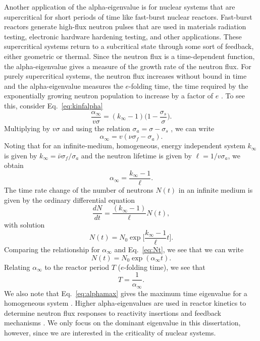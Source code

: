
Another application of the alpha-eigenvalue is for nuclear systems that are supercritical for short periods of time like fast-burst nuclear reactors. Fast-burst reactors generate high-flux neutron pulses that are used in materials radiation testing, electronic hardware hardening testing, and other applications. These supercritical systems return to a subcritical state through some sort of feedback, either geometric or thermal. Since the neutron flux is a time-dependent function, the alpha-eigenvalue gives a measure of the growth rate of the neutron flux. For purely supercritical systems, the neutron flux increases without bound in time and the alpha-eigenvalue measures the $e$-folding time, the time required by the exponentially growing neutron population to increase by a factor of $e$ \cite{duderstadt_nuclear_1976}. To see this, consider Eq.~\ref{eq:kinfalpha}
\begin{equation*}
	\frac{\alpha_{\infty}}{v\sigma} = (k_{\infty}-1) \bigg ( 1 - \frac{\sigma_{s}}{\sigma} \bigg ).
\end{equation*}
Multiplying by $v\sigma$ and using the relation $\sigma_{a} = \sigma - \sigma_{s}$ , we can write
\begin{equation}
	\alpha_{\infty} = v(\nu \sigma_{f} - \sigma_{a}).
\end{equation}
Noting that for an infinite-medium, homogeneous, energy independent system $k_{\infty}$ is given by $k_{\infty} = \bar{\nu} \sigma_{f} / \sigma_{a}$ and the neutron lifetime is given by $\ell = 1/v\sigma_{a}$, we obtain
\begin{equation}
	\alpha_{\infty} = \frac{k_{\infty} - 1}{\ell}.
	\label{eq:alphamax}
\end{equation}
The time rate change of the number of neutrons $N(t)$ in an infinite medium is given by the ordinary differential equation
\begin{equation}
\frac{dN}{dt} = \frac{(k_{\infty} - 1)}{\ell} N(t),
\end{equation}
with solution
\begin{equation}
	N(t) = N_{0} \exp \bigg [ \frac{k_{\infty}-1}{\ell} t \bigg ].
	\label{eq:Nt}
\end{equation}
Comparing the relationship for $\alpha_{\infty}$ and Eq.~\ref{eq:Nt}, we see that we can write
\begin{equation}
	N(t) = N_{0} \exp (\alpha_{\infty} t).
\end{equation}
Relating $\alpha_{\infty}$ to the reactor period $T$ ($e$-folding time), we see that
\begin{equation}
	T = \frac{1}{\alpha_{\infty}}.
\end{equation}
We also note that Eq.~\ref{eq:alphamax} gives the maximum time eigenvalue for a homogeneous system \cite{kornreich_timeeigenvalue_2005}. Higher alpha-eigenvalues are used in reactor kinetics to determine neutron flux responses to reactivity insertions and feedback mechanisms \cite{modak_scheme_2007}. We only focus on the dominant eigenvalue in this dissertation, however, since we are interested in the criticality of nuclear systems.

